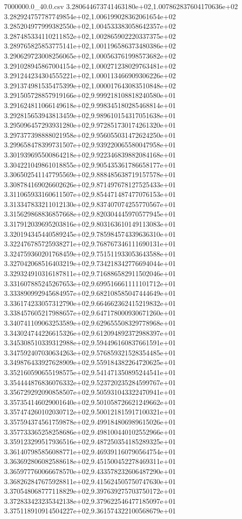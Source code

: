 \begin{filecontents*}{7000000.0_40.0.csv}
3.280644673741463180e+02,1.007862837604170636e+02
3.282924757787749854e+02,1.006199028362061654e+02
3.285204977999382550e+02,1.004533383058642357e+02
3.287485334110211852e+02,1.002865902220337375e+02
3.289765825853775141e+02,1.001196586373480386e+02
3.290629723008256065e+02,1.000563761998573682e+02
3.291028945867004154e+02,1.000271238029763481e+02
3.291244234304555221e+02,1.000113466909306226e+02
3.291374981535475399e+02,1.000017643083510848e+02
3.291505728857919166e+02,9.999218108818240580e+01
3.291624811066149618e+02,9.998345180285468814e+01
3.292815653943813459e+02,9.989610154317051638e+01
3.295096457293931280e+02,9.972851730174261320e+01
3.297377398888021958e+02,9.956055031472624250e+01
3.299658478399731507e+02,9.939220065580047958e+01
3.301939695500864218e+02,9.922346839882084168e+01
3.304221049861018855e+02,9.905435361786658177e+01
3.306502541147795569e+02,9.888485638719157578e+01
3.308784169026602626e+02,9.871497678127525433e+01
3.311065933160611507e+02,9.854471487477076153e+01
3.313347833211012130e+02,9.837407074255770567e+01
3.315629868836857668e+02,9.820304445970577945e+01
3.317912039695203816e+02,9.803163610149113083e+01
3.320194345440589245e+02,9.785984574339636310e+01
3.322476785725938271e+02,9.768767346111690131e+01
3.324759360201768459e+02,9.751511933053643588e+01
3.327042068516403219e+02,9.734218342776694044e+01
3.329324910316187811e+02,9.716886582911502046e+01
3.331607885245267653e+02,9.699516661111101712e+01
3.333890992945684957e+02,9.682108585047444649e+01
3.336174233057312790e+02,9.664662362415219832e+01
3.338457605217988657e+02,9.647178000930671260e+01
3.340741109063253589e+02,9.629655508329778968e+01
3.343024744226615326e+02,9.612094892372988397e+01
3.345308510339312988e+02,9.594496160837661591e+01
3.347592407030634263e+02,9.576859321528354485e+01
3.349876433927628909e+02,9.559184382264720625e+01
3.352160590655198575e+02,9.541471350895244541e+01
3.354444876836076332e+02,9.523720235284599767e+01
3.356729292090858507e+02,9.505931043322470941e+01
3.357354146029001640e+02,9.501058726621249662e+01
3.357474260102030712e+02,9.500121815917100321e+01
3.357594374561759878e+02,9.499184806989615026e+01
3.357733365258258686e+02,9.498100440102552966e+01
3.359123299517936516e+02,9.487250354185289325e+01
3.361407985856088771e+02,9.469391160790564754e+01
3.363692806082588618e+02,9.451500452278469311e+01
3.365977760066678570e+02,9.433578232606487290e+01
3.368262847675928811e+02,9.415624505750747630e+01
3.370548068777118829e+02,9.397639275703750172e+01
3.372833423235342138e+02,9.379622546477185097e+01
3.375118910914504227e+02,9.361574322100568679e+01

\end{filecontents*}
